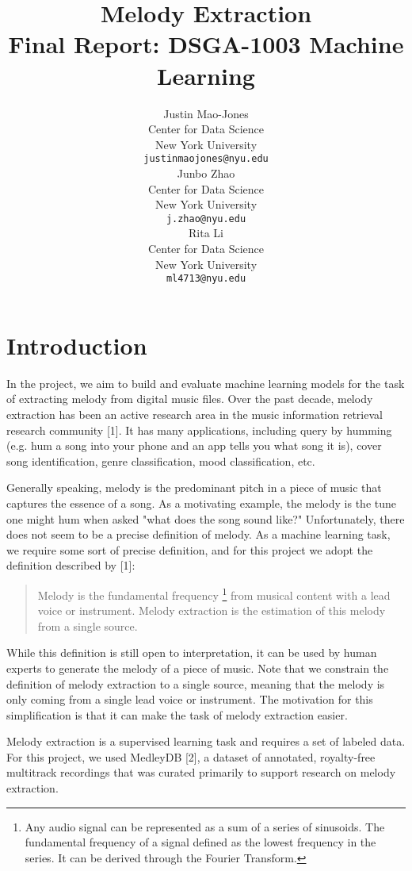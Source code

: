 \documentclass{article} %
\title{Melody Extraction \\ Final Report: DSGA-1003 Machine Learning}
\author{
Justin Mao-Jones \\
Center for Data Science\\
New York University\\
\texttt{justinmaojones@nyu.edu} \\
\And
Junbo Zhao \\
Center for Data Science\\
New York University\\
\texttt{j.zhao@nyu.edu} \\
\AND
Rita Li \\
Center for Data Science\\
New York University\\
\texttt{ml4713@nyu.edu} \\
}
\begin{document}
\maketitle


\section{Introduction}

In the project, we aim to build and evaluate machine learning models for the task of extracting melody from digital music files.  Over the past decade, melody extraction has been an active research area in the music information retrieval research community [1].  It has many applications, including query by humming (e.g. hum a song into your phone and an app tells you what song it is), cover song identification, genre classification, mood classification, etc.

Generally speaking, melody is the predominant pitch in a piece of music that captures the essence of a song.  As a motivating example, the melody is the tune one might hum when asked "what does the song sound like?"  Unfortunately, there does not seem to be a precise definition of melody.  As a machine learning task, we require some sort of precise definition, and for this project we adopt the definition described by [1]:

\begin{quote}
Melody is the fundamental frequency \footnote{Any audio signal can be represented as a sum of a series of sinusoids.  The fundamental frequency of a signal defined as the lowest frequency in the series.  It can be derived through the Fourier Transform.} from musical content with a lead voice or instrument.  Melody extraction is the estimation of this melody from a single source.
\end{quote}

While this definition is still open to interpretation, it can be used by human experts to generate the melody of a piece of music.  Note that we constrain the definition of melody extraction to a single source, meaning that the melody is only coming from a single lead voice or instrument.  The motivation for this simplification is that it can make the task of melody extraction easier.

Melody extraction is a supervised learning task and requires a set of labeled data.  For this project, we used MedleyDB [2], a dataset of annotated, royalty-free multitrack recordings that was curated primarily to support research on melody extraction.
\end{document}
